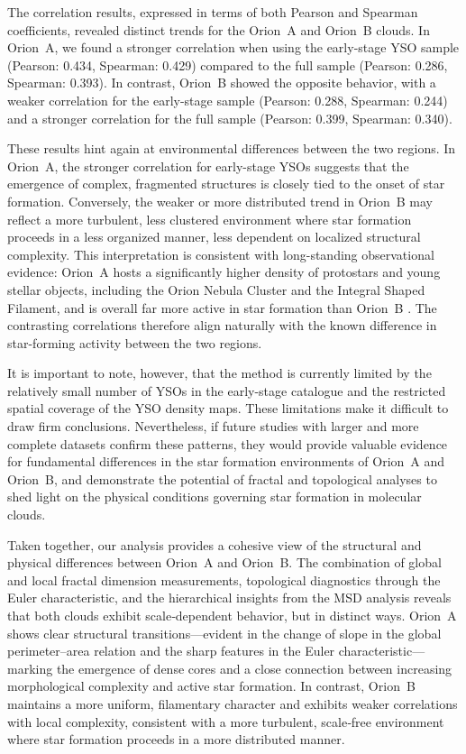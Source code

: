The correlation results, expressed in terms of both Pearson and Spearman coefficients, revealed distinct trends for the Orion~A and Orion~B clouds. In Orion~A, we found a stronger correlation when using the early-stage YSO sample (Pearson: 0.434, Spearman: 0.429) compared to the full sample (Pearson: 0.286, Spearman: 0.393). In contrast, Orion~B showed the opposite behavior, with a weaker correlation for the early-stage sample (Pearson: 0.288, Spearman: 0.244) and a stronger correlation for the full sample (Pearson: 0.399, Spearman: 0.340).

These results hint again at environmental differences between the two regions.  
In Orion~A, the stronger correlation for early-stage YSOs suggests that the emergence of complex, fragmented structures is closely tied to the onset of star formation.  
Conversely, the weaker or more distributed trend in Orion~B may reflect a more turbulent, less clustered environment where star formation proceeds in a less organized manner, less dependent on localized structural complexity.  
This interpretation is consistent with long-standing observational evidence: Orion~A hosts a significantly higher density of protostars and young stellar objects, including the Orion Nebula Cluster and the Integral Shaped Filament, and is overall far more active in star formation than Orion~B \cite{megeath2012catalogue}.  
The contrasting correlations therefore align naturally with the known difference in star-forming activity between the two regions.

It is important to note, however, that the method is currently limited by the relatively small number of YSOs in the early-stage catalogue and the restricted spatial coverage of the YSO density maps. These limitations make it difficult to draw firm conclusions. Nevertheless, if future studies with larger and more complete datasets confirm these patterns, they would provide valuable evidence for fundamental differences in the star formation environments of Orion~A and Orion~B, and demonstrate the potential of fractal and topological analyses to shed light on the physical conditions governing star formation in molecular clouds.

Taken together, our analysis provides a cohesive view of the structural and physical differences between Orion~A and Orion~B.  
The combination of global and local fractal dimension measurements, topological diagnostics through the Euler characteristic, and the hierarchical insights from the MSD analysis reveals that both clouds exhibit scale‑dependent behavior, but in distinct ways.  
Orion~A shows clear structural transitions—evident in the change of slope in the global perimeter–area relation and the sharp features in the Euler characteristic—marking the emergence of dense cores and a close connection between increasing morphological complexity and active star formation.  
In contrast, Orion~B maintains a more uniform, filamentary character and exhibits weaker correlations with local complexity, consistent with a more turbulent, scale‑free environment where star formation proceeds in a more distributed manner.  

